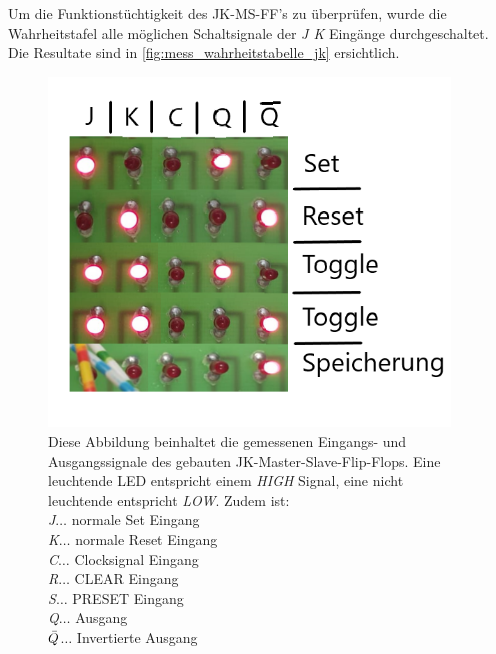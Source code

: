 \documentclass[12pt,english,ngerman]{scrartcl}
\begin{document}
Um die Funktionstüchtigkeit des JK-MS-FF's zu überprüfen, wurde die
Wahrheitstafel alle möglichen Schaltsignale der \textit{J K} Eingänge
durchgeschaltet. Die Resultate sind in \autoref{fig:mess_wahrheitstabelle_jk}
ersichtlich.

\begin{figure}[H]
  \centering
    \includegraphics[width=0.95\textwidth]{./figures/messungen/jk/wahrheit.png}
  \caption{Diese Abbildung beinhaltet die gemessenen Eingangs- und
  Ausgangssignale des gebauten JK-Master-Slave-Flip-Flops. Eine leuchtende
  LED entspricht einem \textit{HIGH} Signal, eine nicht leuchtende entspricht
  \textit{LOW}. Zudem ist:\\ 
    \textit{J}$\dots$ normale Set Eingang\\
    \textit{K}$\dots$ normale Reset Eingang\\
    \textit{C}$\dots$ Clocksignal Eingang\\
    \textit{R}$\dots$ CLEAR Eingang\\
    \textit{S}$\dots$ PRESET Eingang\\
    \textit{Q}$\dots$ Ausgang\\
  \textit{$\Bar{Q}$}$\dots$ Invertierte Ausgang}
\label{fig:mess_wahrheitstabelle_jk}
\end{figure}
\end{document}

